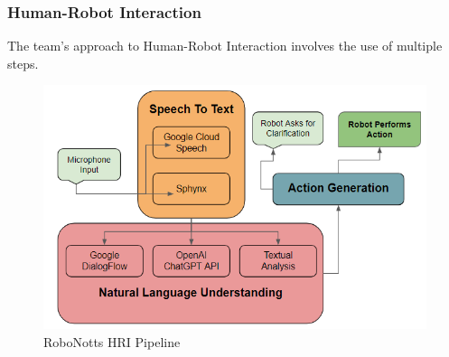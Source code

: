 \subsubsection{Human-Robot Interaction} 

The team's approach to Human-Robot Interaction involves the use of multiple steps.

\begin{figure}
    \centering
    \includegraphics[scale=0.40]{HRI.png}
    \caption{RoboNotts HRI Pipeline} \label{fig.1}
\end{figure}

